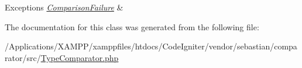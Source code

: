 \begin{DoxyExceptions}{Exceptions}
{\em \mbox{\hyperlink{class_sebastian_bergmann_1_1_comparator_1_1_comparison_failure}{Comparison\+Failure}}} & \\
\hline
\end{DoxyExceptions}


The documentation for this class was generated from the following file\+:\begin{DoxyCompactItemize}
\item 
/\+Applications/\+X\+A\+M\+P\+P/xamppfiles/htdocs/\+Code\+Igniter/vendor/sebastian/comparator/src/\mbox{\hyperlink{_type_comparator_8php}{Type\+Comparator.\+php}}\end{DoxyCompactItemize}
